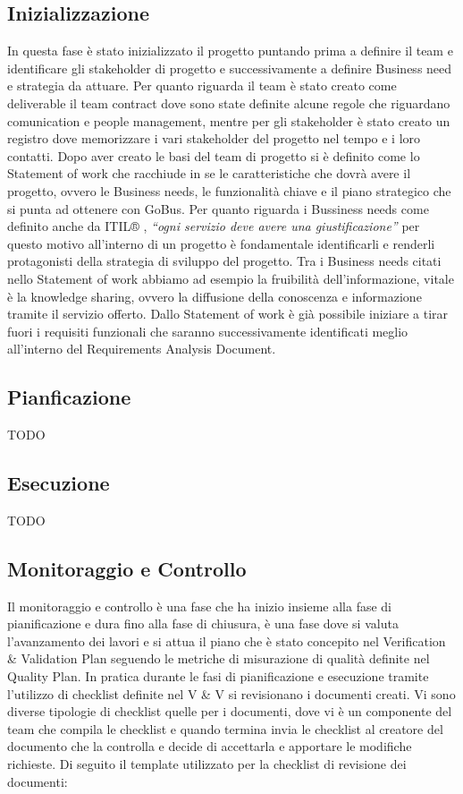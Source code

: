 \subsection{Inizializzazione}
In questa fase è stato inizializzato il progetto puntando prima a definire il team e identificare gli stakeholder di progetto e successivamente a definire Business need e strategia da attuare. Per quanto riguarda il team è stato creato come deliverable il team contract dove sono state definite alcune regole che riguardano comunication e people management, mentre per gli stakeholder è stato creato un registro dove memorizzare i vari stakeholder del progetto nel tempo e i loro contatti. Dopo aver creato le basi del team di progetto si è definito come lo Statement of work che racchiude in se le caratteristiche che dovrà avere il progetto, ovvero le Business needs, le funzionalità chiave e il piano strategico che si punta ad ottenere con GoBus. Per quanto riguarda i Bussiness needs come definito anche da ITIL® \cite{ITIL}, \emph{``ogni servizio deve avere una giustificazione''} per questo motivo all’interno di un progetto è fondamentale identificarli e renderli protagonisti della strategia di sviluppo del progetto. Tra i Business needs citati nello Statement of work abbiamo ad esempio la fruibilità dell’informazione, vitale è la knowledge sharing, ovvero la diffusione della conoscenza e informazione tramite il servizio offerto. Dallo Statement of work è già possibile iniziare a tirar fuori i requisiti funzionali che saranno successivamente identificati meglio all’interno del Requirements Analysis Document.

\subsection{Pianficazione}
TODO

\subsection{Esecuzione}
TODO

\subsection{Monitoraggio e Controllo}
Il monitoraggio e controllo è una fase che ha inizio insieme alla fase di pianificazione e dura fino alla fase di chiusura, è una fase dove si valuta l’avanzamento dei lavori e si attua il piano che è stato concepito nel Verification \& Validation Plan seguendo le metriche di misurazione di qualità definite nel Quality Plan. In pratica durante le fasi di pianificazione e esecuzione tramite l’utilizzo di checklist definite nel V \& V si revisionano i documenti creati. Vi sono diverse tipologie di checklist quelle per i documenti, dove vi è un componente del team che compila le checklist e quando termina invia le checklist al creatore del documento che la controlla e decide di accettarla e apportare le modifiche richieste. Di seguito il template utilizzato per la checklist di revisione dei documenti:\\

